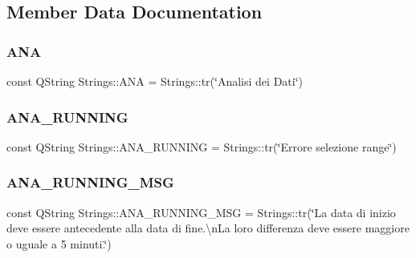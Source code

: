 \subsection{Member Data Documentation}
\mbox{\label{class_strings_a5b3c4480aa7f534900f712f96e4c2174}} 
\subsubsection{\texorpdfstring{A\+NA}{ANA}}
{\footnotesize\ttfamily const Q\+String Strings\+::\+A\+NA = Strings\+::tr(\char`\"{}Analisi dei Dati\char`\"{})\hspace{0.3cm}{\ttfamily [static]}}

\mbox{\label{class_strings_acf03fc4cedf332babb378f6745735399}} 
\subsubsection{\texorpdfstring{A\+N\+A\+\_\+\+R\+U\+N\+N\+I\+NG}{ANA\_RUNNING}}
{\footnotesize\ttfamily const Q\+String Strings\+::\+A\+N\+A\+\_\+\+R\+U\+N\+N\+I\+NG = Strings\+::tr(\char`\"{}Errore selezione range\char`\"{})\hspace{0.3cm}{\ttfamily [static]}}

\mbox{\label{class_strings_a9dcdf53029ed4318fb2aa47bd71611ea}} 
\subsubsection{\texorpdfstring{A\+N\+A\+\_\+\+R\+U\+N\+N\+I\+N\+G\+\_\+\+M\+SG}{ANA\_RUNNING\_MSG}}
{\footnotesize\ttfamily const Q\+String Strings\+::\+A\+N\+A\+\_\+\+R\+U\+N\+N\+I\+N\+G\+\_\+\+M\+SG = Strings\+::tr(\char`\"{}La data di inizio deve essere antecedente alla data di fine.\textbackslash{}n\+La loro differenza deve essere maggiore o uguale a 5 minuti.\char`\"{})\hspace{0.3cm}{\ttfamily [static]}}

